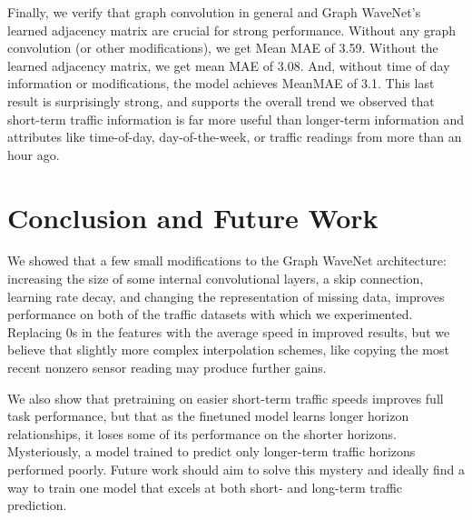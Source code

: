 \documentclass[10pt]{article}
\begin{document}
Finally, we verify that graph convolution in general and Graph WaveNet's learned adjacency matrix are crucial for strong performance. Without any graph convolution (or other modifications), we get Mean MAE of 3.59. Without the learned adjacency matrix, we get mean MAE of 3.08. And, without time of day information or modifications, the model achieves MeanMAE of 3.1. This last result is surprisingly strong, and supports the overall trend we observed that short-term traffic information is far more useful than longer-term information and attributes like time-of-day, day-of-the-week, or traffic readings from more than an hour ago.

\section{Conclusion and Future Work}
We showed that a few small modifications to the Graph WaveNet architecture: increasing the size of some internal convolutional layers, a skip connection, learning rate decay, and changing the representation of missing data, improves performance on both of the traffic datasets with which we experimented. Replacing 0s in the features with the average speed in improved results, but we believe that slightly more complex interpolation schemes, like copying the most recent nonzero sensor reading may produce further gains.

We also show that pretraining on easier short-term traffic speeds improves full task performance, but that as the finetuned model learns longer horizon relationships, it loses some of its performance on the shorter horizons. Mysteriously, a model trained to predict only longer-term traffic horizons performed poorly. Future work should aim to solve this mystery and ideally find a way to train one model that excels at both short- and long-term traffic prediction.
\newpage


\end{document}
